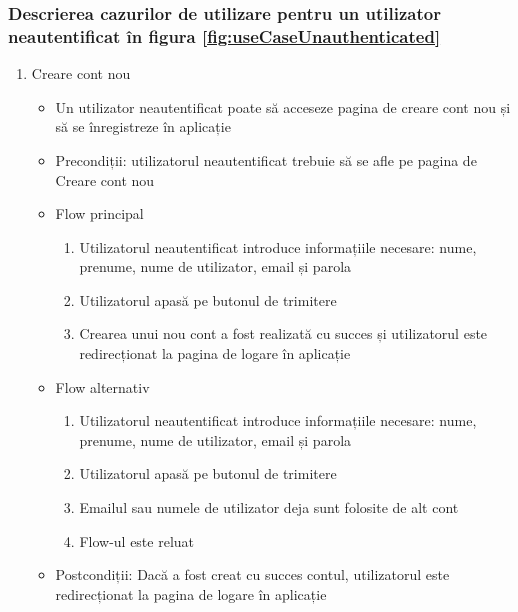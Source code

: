\subsubsection{Descrierea cazurilor de utilizare pentru un utilizator neautentificat în figura \ref{fig:useCaseUnauthenticated}}
\begin{enumerate}
    \item Creare cont nou 
    \begin{itemize}
        \setlength\itemsep{0.5em}
        \item Un utilizator neautentificat poate să acceseze pagina de creare cont nou și să se înregistreze în aplicație
        \item Precondiții: utilizatorul neautentificat trebuie să se afle pe pagina de Creare cont nou
        \item Flow principal
        \begin{enumerate}
            \item Utilizatorul neautentificat introduce informațiile necesare: nume, prenume, nume de utilizator, email și parola
            \item Utilizatorul apasă pe butonul de trimitere
            \item Crearea unui nou cont a fost realizată cu succes și utilizatorul este redirecționat la pagina de logare în aplicație
        \end{enumerate}
        \item Flow alternativ
        \begin{enumerate}
            \item Utilizatorul neautentificat introduce informațiile necesare: nume, prenume, nume de utilizator, email și parola
            \item Utilizatorul apasă pe butonul de trimitere
            \item Emailul sau numele de utilizator deja sunt folosite de alt cont
            \item Flow-ul este reluat
        \end{enumerate}
        \item Postcondiții: Dacă a fost creat cu succes contul, utilizatorul este redirecționat la pagina de logare în aplicație
    \end{itemize}


\end{enumerate}
